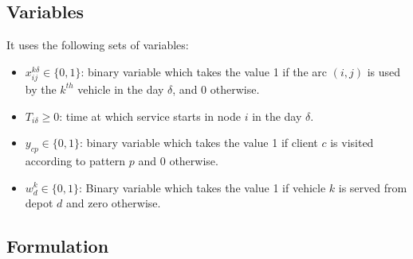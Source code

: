 \documentclass[preprint,review,12pt]{elsarticle}
\begin{document}
\subsection{Variables}
It uses the following sets of variables:

\begin{itemize}
	\item  $x_{ij}^{k\delta}  \in  \{ 0,1 \}$: binary variable which takes the value 1 if the arc $(i,j)$ is used by the $k^{th}$ vehicle in the day $\delta$, and 0 otherwise. 
	\item $T_{i\delta} \geq 0$: time at which service starts in node $i$ in the day $\delta$. 
	\item $y_{cp} \in  \{ 0,1 \}$: binary variable which takes the value 1 if client $c$ is visited according to pattern $p$ and 0 otherwise.
	\item  $w_d^k \in  \{0,1\}$: Binary variable which takes the value 1 if vehicle $k$ is served from depot $d$ and zero otherwise.
\end{itemize}

\subsection{Formulation}
\end{document}
